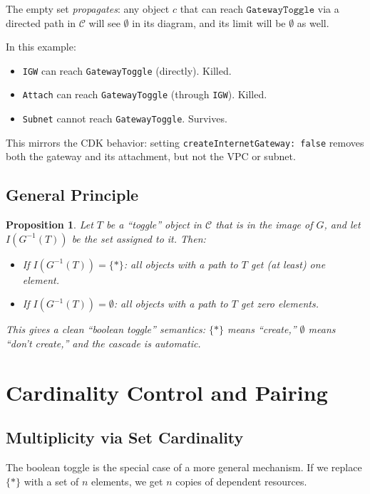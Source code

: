 \documentclass[11pt,a4paper]{article}
\theoremstyle{definition}
\theoremstyle{plain}
\newtheorem{proposition}{Proposition}[section]
\begin{document}
The empty set \emph{propagates}: any object $c$ that can reach $\texttt{GatewayToggle}$ via a directed path in $\mathcal{C}$ will see $\emptyset$ in its diagram, and its limit will be $\emptyset$ as well.

In this example:
\begin{itemize}
  \item \texttt{IGW} can reach \texttt{GatewayToggle} (directly). Killed.
  \item \texttt{Attach} can reach \texttt{GatewayToggle} (through \texttt{IGW}). Killed.
  \item \texttt{Subnet} cannot reach \texttt{GatewayToggle}. Survives.
\end{itemize}

This mirrors the CDK behavior: setting \texttt{createInternetGateway: false} removes both the gateway and its attachment, but not the VPC or subnet.

\subsection{General Principle}

\begin{proposition}
Let $T$ be a ``toggle'' object in $\mathcal{C}$ that is in the image of $G$, and let $I(G^{-1}(T))$ be the set assigned to it. Then:
\begin{itemize}
  \item If $I(G^{-1}(T)) = \{*\}$: all objects with a path to $T$ get (at least) one element.
  \item If $I(G^{-1}(T)) = \emptyset$: all objects with a path to $T$ get zero elements.
\end{itemize}
This gives a clean ``boolean toggle'' semantics: $\{*\}$ means ``create,'' $\emptyset$ means ``don't create,'' and the cascade is automatic.
\end{proposition}

\section{Cardinality Control and Pairing}
\label{sec:cardinality}

\subsection{Multiplicity via Set Cardinality}

The boolean toggle is the special case of a more general mechanism. If we replace $\{*\}$ with a set of $n$ elements, we get $n$ copies of dependent resources.
\end{document}
